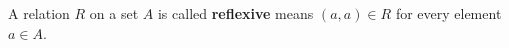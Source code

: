 
A relation $R$ on a set $A$ is called {\bf reflexive} 
means $(a, a) \in R$ for every element $a \in A$. 
